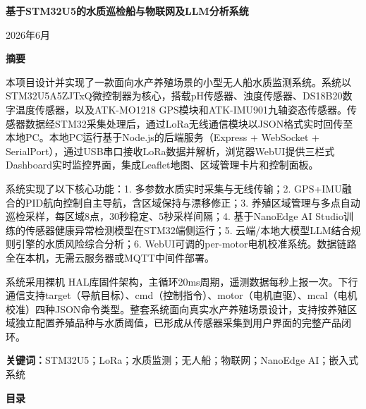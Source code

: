 \documentclass[12pt,a4paper]{ctexart}
\begin{document}
\begin{titlepage}
\centering
\vspace*{6cm}

{\Huge\bfseries 基于STM32U5的水质巡检船与物联网及LLM分析系统\par}

\vfill

{\normalsize 2026年6月}

\end{titlepage}

\begin{center}
{\Large\bfseries 摘\quad\quad 要\par}
\end{center}

本项目设计并实现了一款面向水产养殖场景的小型无人船水质监测系统。系统以STM32U5A5ZJTxQ微控制器为核心，搭载pH传感器、浊度传感器、DS18B20数字温度传感器，以及ATK-MO1218 GPS模块和ATK-IMU901九轴姿态传感器。传感器数据经STM32采集处理后，通过LoRa无线通信模块以JSON格式实时回传至本地PC。本地PC运行基于Node.js的后端服务（Express + WebSocket + SerialPort），通过USB串口接收LoRa数据并解析，浏览器WebUI提供三栏式Dashboard实时监控界面，集成Leaflet地图、区域管理卡片和控制面板。

系统实现了以下核心功能：1. 多参数水质实时采集与无线传输；2. GPS+IMU融合的PID航向控制自主导航，含区域保持与漂移修正；3. 养殖区域管理与多点自动巡检采样，每区域8点，30秒稳定、5秒采样间隔；4. 基于NanoEdge AI Studio训练的传感器健康异常检测模型在STM32端侧运行；5. 云端/本地大模型LLM结合规则引擎的水质风险综合分析；6. WebUI可调的per-motor电机校准系统。数据链路全在本机，无需云服务器或MQTT中间件部署。

系统采用裸机 HAL库固件架构，主循环20ms周期，遥测数据每秒上报一次。下行通信支持target（导航目标）、cmd（控制指令）、motor（电机直驱）、mcal（电机校准）四种JSON命令类型。整套系统面向真实水产养殖场景设计，支持按养殖区域独立配置养殖品种与水质阈值，已形成从传感器采集到用户界面的完整产品闭环。

\vspace{1em}
\noindent\textbf{关键词：}STM32U5；LoRa；水质监测；无人船；物联网；NanoEdge AI；嵌入式系统

\newpage
\renewcommand{\contentsname}{}
\begin{center}
{\Large\bfseries 目\quad\quad 录}
\end{center}
\begingroup
\hypersetup{linkcolor=black}
\tableofcontents
\endgroup
\newpage
\end{document}
